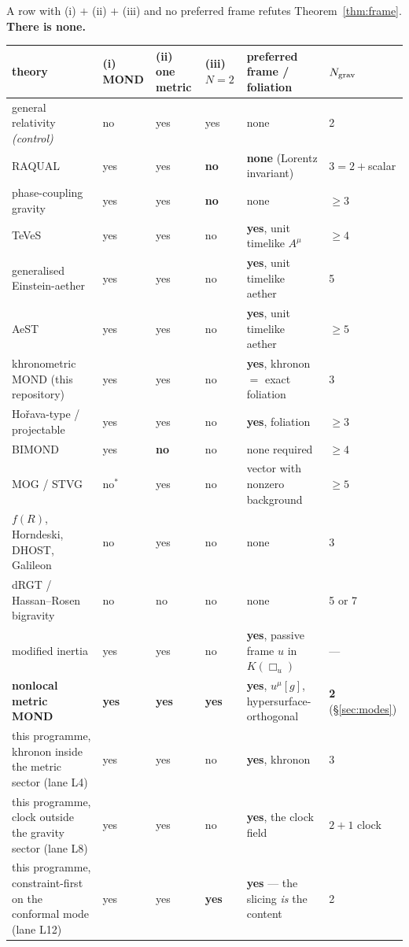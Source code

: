 \documentclass[11pt,letterpaper]{article}
\newcommand{\dal}{\Box}
\begin{document}
A row with (i) $+$ (ii) $+$ (iii) and no preferred frame refutes Theorem~\ref{thm:frame}. \textbf{There is none.}

\begin{center}\footnotesize\setlength{\tabcolsep}{4pt}
\begin{tabular}{L{0.255\textwidth}L{0.065\textwidth}L{0.06\textwidth}L{0.05\textwidth}L{0.255\textwidth}L{0.105\textwidth}}\toprule
theory & (i) MOND & (ii) one metric & (iii) $N{=}2$ & preferred frame / foliation & $N_{\rm grav}$\\\midrule
general relativity \emph{(control)} & no & yes & yes & none & 2\\
RAQUAL \cite{BekensteinMilgrom1984} & yes & yes & \textbf{no} & \textbf{none} (Lorentz invariant) & $3=2+$scalar\\
phase-coupling gravity \cite{Bekenstein1988} & yes & yes & \textbf{no} & none & $\ge3$\\
TeVeS \cite{Bekenstein2004} & yes & yes & no & \textbf{yes}, unit timelike $A^\mu$ & $\ge4$\\
generalised Einstein-aether \cite{Zlosnik2007} & yes & yes & no & \textbf{yes}, unit timelike aether & 5\\
AeST \cite{SkordisZlosnik2021} & yes & yes & no & \textbf{yes}, unit timelike aether & $\ge5$\\
khronometric MOND (this repository) & yes & yes & no & \textbf{yes}, khronon $=$ exact foliation & 3\\
Ho\v{r}ava-type / projectable \cite{Horava2009,Jacobson2010} & yes & yes & no & \textbf{yes}, foliation & $\ge3$\\
BIMOND \cite{Milgrom2009} & yes & \textbf{no} & no & none required & $\ge4$\\
MOG / STVG \cite{Moffat2006} & no$^{*}$ & yes & no & vector with nonzero background & $\ge5$\\
$f(R)$, Horndeski, DHOST, Galileon \cite{Horndeski1974} & no & yes & no & none & 3\\
dRGT / Hassan--Rosen bigravity \cite{deRham2011} & no & no & no & none & 5 or 7\\
modified inertia \cite{Milgrom1994} & yes & yes & no & \textbf{yes}, passive frame $u$ in $K(\dal_u)$ & ---\\
\textbf{nonlocal metric MOND} \cite{Deffayet2011,DeffayetWoodard2026} & \textbf{yes} & \textbf{yes} & \textbf{yes} & \textbf{yes}, $u^\mu[g]$, hypersurface-orthogonal & \textbf{2} (\S\ref{sec:modes})\\
this programme, khronon inside the metric sector (lane L4) & yes & yes & no & \textbf{yes}, khronon & 3\\
this programme, clock outside the gravity sector (lane L8) & yes & yes & no & \textbf{yes}, the clock field & $2+1$ clock\\
this programme, constraint-first on the conformal mode (lane L12) & yes & yes & \textbf{yes} & \textbf{yes} --- the slicing \emph{is} the content & 2\\\bottomrule
\end{tabular}
\end{center}
\end{document}
